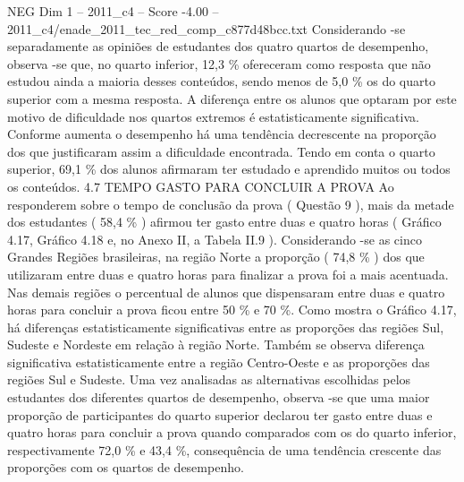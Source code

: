 \begin{textsample}{NEG Dim 1 – 2011\_c4 – Score -4.00 – 2011\_c4/enade\_2011\_tec\_red\_comp\_c877d48bcc.txt}
Considerando -se separadamente as opiniões de estudantes dos quatro quartos de desempenho, observa -se que, no quarto inferior, 12,3 \% ofereceram como resposta que não estudou ainda a maioria desses conteúdos, sendo menos de 5,0 \% os do quarto superior com a mesma resposta.
A diferença entre os alunos que optaram por este motivo de dificuldade nos quartos extremos é estatisticamente significativa.
Conforme aumenta o desempenho há uma tendência decrescente na proporção dos que justificaram assim a dificuldade encontrada.
Tendo em conta o quarto superior, 69,1 \% dos alunos afirmaram ter estudado e aprendido muitos ou todos os conteúdos. 4.7 TEMPO GASTO PARA CONCLUIR A PROVA Ao responderem sobre o tempo de conclusão da prova ( Questão 9 ), mais da metade dos estudantes ( 58,4 \% ) afirmou ter gasto entre duas e quatro horas ( Gráfico 4.17, Gráfico 4.18 e, no Anexo II, a Tabela II.9 ).
Considerando -se as cinco Grandes Regiões brasileiras, na região Norte a proporção ( 74,8 \% ) dos que utilizaram entre duas e quatro horas para finalizar a prova foi a mais acentuada.
Nas demais regiões o percentual de alunos que dispensaram entre duas e quatro horas para concluir a prova ficou entre 50 \% e 70 \%.
Como mostra o Gráfico 4.17, há diferenças estatisticamente significativas entre as proporções das regiões Sul, Sudeste e Nordeste em relação à região Norte.
Também se observa diferença significativa estatisticamente entre a região Centro-Oeste e as proporções das regiões Sul e Sudeste.
Uma vez analisadas as alternativas escolhidas pelos estudantes dos diferentes quartos de desempenho, observa -se que uma maior proporção de participantes do quarto superior declarou ter gasto entre duas e quatro horas para concluir a prova quando comparados com os do quarto inferior, respectivamente 72,0 \% e 43,4 \%, consequência de uma tendência crescente das proporções com os quartos de desempenho.

\end{textsample}
